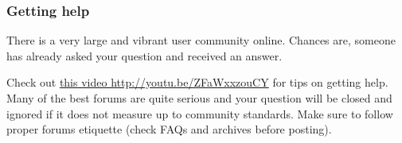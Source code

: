 \documentclass[11pt,ignorenonframetext,aspectratio=169]{beamer}
\begin{document}
\begin{frame}\frametitle{Getting help}

There is a very large and vibrant user community online. Chances are,
someone has already asked your question and received an answer.

Check out \href{http://youtu.be/ZFaWxxzouCY}{this video
http://youtu.be/ZFaWxxzouCY} for tips on getting help. Many of the best
forums are quite serious and your question will be closed and ignored if
it does not measure up to community standards. Make sure to follow
proper forums etiquette (check FAQs and archives before posting).

\end{frame}
\end{document}
